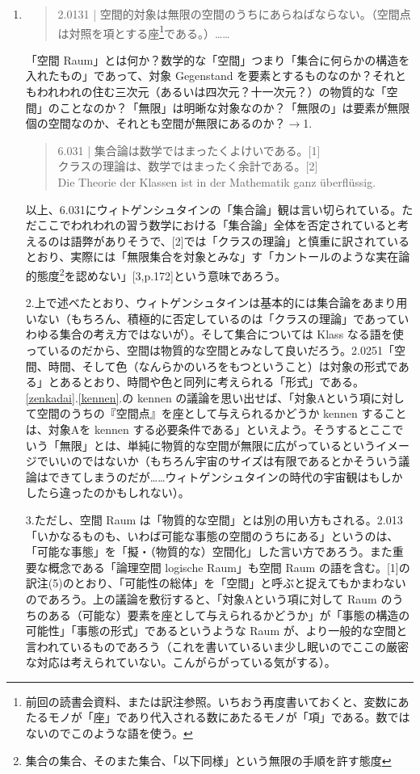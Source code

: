 \documentclass[11pt,a4paper]{jsbook}
\begin{document}
\begin{enumerate}
\item
\begin{quote}
2.0131 | 空間的対象は無限の空間のうちにあらねばならない。（空間点は対照を項とする座\footnote{前回の読書会資料、または訳注参照。いちおう再度書いておくと、変数にあたるモノが「座」であり代入される数にあたるモノが「項」である。数ではないのでこのような語を使う。}である。）……
\end{quote}
「空間 Raum」とは何か？数学的な「空間」つまり「集合に何らかの構造を入れたもの」であって、対象 Gegenstand を要素とするものなのか？それともわれわれの住む三次元（あるいは四次元？十一次元？）の物質的な「空間」のことなのか？「無限」は明晰な対象なのか？「無限の」は要素が無限個の空間なのか、それとも空間が無限にあるのか？$\rightarrow$1.
\begin{quote}
6.031 | 集合論は数学ではまったくよけいである。[1] \\
 クラスの理論は、数学ではまったく余計である。[2] \\
 Die Theorie der Klassen ist in der Mathematik ganz \"uberfl\"ussig.
\end{quote}
以上、6.031にウィトゲンシュタインの「集合論」観は言い切られている。ただここでわれわれの習う数学における「集合論」全体を否定されていると考えるのは語弊がありそうで、[2]では「クラスの理論」と慎重に訳されているとおり、実際には「無限集合を対象とみな」す「カントールのような実在論的態度\footnote{集合の集合、そのまた集合、「以下同様」という無限の手順を許す態度}を認めない」[3,p.172]という意味であろう。

2.上で述べたとおり、ウィトゲンシュタインは基本的には集合論をあまり用いない（もちろん、積極的に否定しているのは「クラスの理論」であっていわゆる集合の考え方ではないが）。そして集合については Klass なる語を使っているのだから、空間は物質的な空間とみなして良いだろう。2.0251「空間、時間、そして色（なんらかのいろをもつということ）は対象の形式である」とあるとおり、時間や色と同列に考えられる「形式」である。\ref{zenkadai}.\ref{kennen}.の kennen の議論を思い出せば、「対象Aという項に対して空間のうちの『空間点』を座として与えられるかどうか kennen することは、対象Aを kennen する必要条件である」といえよう。そうするとここでいう「無限」とは、単純に物質的な空間が無限に広がっているというイメージでいいのではないか（もちろん宇宙のサイズは有限であるとかそういう議論はできてしまうのだが……ウィトゲンシュタインの時代の宇宙観はもしかしたら違ったのかもしれない）。

3.ただし、空間 Raum は「物質的な空間」とは別の用い方もされる。2.013「いかなるものも、いわば可能な事態の空間のうちにある」というのは、「可能な事態」を「擬・（物質的な）空間化」した言い方であろう。また重要な概念である「論理空間 logische Raum」も空間 Raum の語を含む。[1]の訳注(5)のとおり、「可能性の総体」を「空間」と呼ぶと捉えてもかまわないのであろう。上の議論を敷衍すると、「対象Aという項に対して Raum のうちのある（可能な）要素を座として与えられるかどうか」が「事態の構造の可能性」「事態の形式」であるというような Raum が、より一般的な空間と言われているものであろう（これを書いているいま少し眠いのでここの厳密な対応は考えられていない。こんがらがっている気がする）。
\end{enumerate}
\end{document}
